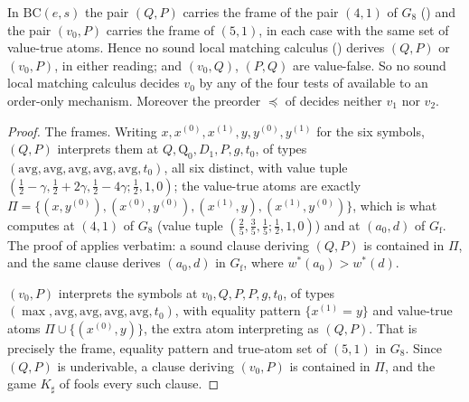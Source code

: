 \begin{proposition}\label{ob:bc-lmc}
In $\mathrm{BC}(e,s)$ the pair $(Q,P)$ carries the frame of the pair
$(4,1)$ of $G_8$ () and the
pair $(v_0,P)$ carries the frame of $(5,1)$, in each case with the same
set of value-true atoms. Hence no sound local matching calculus
() derives $(Q,P)$ or $(v_0,P)$, in either reading; and
$(v_0,Q)$, $(P,Q)$ are value-false. So no sound local matching calculus
decides $v_0$ by any of the four tests of 
available to an order-only mechanism. Moreover the preorder $\preceq$ of
 decides neither $v_1$ nor $v_2$.
\end{proposition}

\begin{proof}
The frames. Writing $x,x^{(0)},x^{(1)},y,y^{(0)},y^{(1)}$ for the six
symbols, $(Q,P)$ interprets them at $Q,\mathrm{Q}_0,D_1,P,g,t_0$, of types
$(\mathrm{avg},\mathrm{avg},\mathrm{avg},\mathrm{avg},\mathrm{avg},t_0)$,
all six distinct, with value tuple
$(\tfrac12-\gamma,\tfrac12+2\gamma,\tfrac12-4\gamma;\tfrac12,1,0)$; the
value-true atoms are exactly
$\Pi=\{(x,y^{(0)}),(x^{(0)},y^{(0)}),(x^{(1)},y),(x^{(1)},y^{(0)})\}$,
which is what  computes at $(4,1)$ of $G_8$
(value tuple $(\tfrac25,\tfrac35,\tfrac15;\tfrac12,1,0)$) and at
$(a_0,d)$ of $G_{\mathrm f}$. The proof of 
applies verbatim: a sound clause deriving $(Q,P)$ is contained in $\Pi$,
and the same clause derives $(a_0,d)$ in $G_{\mathrm f}$, where
$w^\ast(a_0)>w^\ast(d)$.

$(v_0,P)$ interprets the symbols at $v_0,Q,P,P,g,t_0$, of types
$(\max,\mathrm{avg},\mathrm{avg},\mathrm{avg},\mathrm{avg},t_0)$, with
equality pattern $\{x^{(1)}=y\}$ and value-true atoms
$\Pi\cup\{(x^{(0)},y)\}$, the extra atom interpreting as $(Q,P)$. That is
precisely the frame, equality pattern and true-atom set of $(5,1)$ in
$G_8$. Since $(Q,P)$ is underivable, a clause deriving $(v_0,P)$ is
contained in $\Pi$, and the game $K_\sharp$ of 
fools every such clause.


\end{proof}
